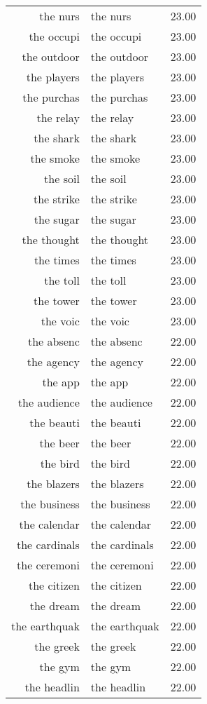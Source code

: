 \begin{table}[ht]
\begin{tabular}{rlr}
  the nurs & the nurs & 23.00 \\ 
  the occupi & the occupi & 23.00 \\ 
  the outdoor & the outdoor & 23.00 \\ 
  the players & the players & 23.00 \\ 
  the purchas & the purchas & 23.00 \\ 
  the relay & the relay & 23.00 \\ 
  the shark & the shark & 23.00 \\ 
  the smoke & the smoke & 23.00 \\ 
  the soil & the soil & 23.00 \\ 
  the strike & the strike & 23.00 \\ 
  the sugar & the sugar & 23.00 \\ 
  the thought & the thought & 23.00 \\ 
  the times & the times & 23.00 \\ 
  the toll & the toll & 23.00 \\ 
  the tower & the tower & 23.00 \\ 
  the voic & the voic & 23.00 \\ 
  the absenc & the absenc & 22.00 \\ 
  the agency & the agency & 22.00 \\ 
  the app & the app & 22.00 \\ 
  the audience & the audience & 22.00 \\ 
  the beauti & the beauti & 22.00 \\ 
  the beer & the beer & 22.00 \\ 
  the bird & the bird & 22.00 \\ 
  the blazers & the blazers & 22.00 \\ 
  the business & the business & 22.00 \\ 
  the calendar & the calendar & 22.00 \\ 
  the cardinals & the cardinals & 22.00 \\ 
  the ceremoni & the ceremoni & 22.00 \\ 
  the citizen & the citizen & 22.00 \\ 
  the dream & the dream & 22.00 \\ 
  the earthquak & the earthquak & 22.00 \\ 
  the greek & the greek & 22.00 \\ 
  the gym & the gym & 22.00 \\ 
  the headlin & the headlin & 22.00 \\ 

\end{tabular}
\end{table}
